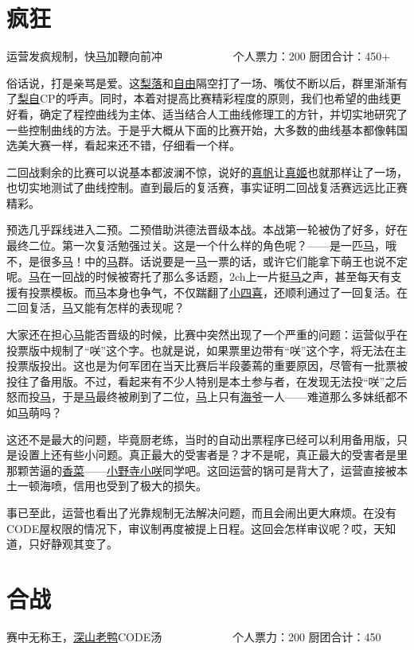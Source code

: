 \chapter{疯狂}
\begin{center}
{\subTitle 运营发疯规制，快\uline{马}加鞭向前冲}
\subMemo
　　　　　　个人票力：200 厨团合计：450+
\end{center}

俗话说，打是亲骂是爱。这\uline{梨落}和\uline{自由}隔空打了一场、嘴仗不断以后，群里渐渐有了\uline{梨}\uline{自}CP的呼声。同时，本着对提高比赛精彩程度的原则，我们也希望的曲线更好看，确定了程控曲线为主体、适当结合人工曲线修理工的方针，并切实地研究了一些控制曲线的方法。于是乎大概从下面的比赛开始，大多数的曲线基本都像韩国选美大赛一样，看起来还不错，仔细看一个样。

二回战剩余的比赛可以说基本都波澜不惊，说好的\uline{真帆}让\uline{真姬}也就那样让了一场，也切实地测试了曲线控制。直到最后的复活赛，事实证明二回战复活赛远远比正赛精彩。

预选几乎踩线进入二预。二预借助洪德法晋级本战。本战第一轮被伪了好多，好在最终二位。第一次复活勉强过关。这是一个什么样的角色呢？——是一匹\uline{马}，哦不，是很多\uline{马}！中的\uline{马}群。话说要是一\uline{马}一票的话，或许它们能拿下萌王也说不定呢。\uline{马}在一回战的时候被寄托了那么多话题，2ch上一片挺\uline{马}之声，甚至每天有支援有投票模板。而\uline{马}本身也争气，不仅踹翻了\uline{小四喜}，还顺利通过了一回复活。在二回复活，\uline{马}又能有怎样的表现呢？

大家还在担心\uline{马}能否晋级的时候，比赛中突然出现了一个严重的问题：运营似乎在投票版中规制了“咲”这个字。也就是说，如果票里边带有“咲”这个字，将无法在主投票版投出。这也是为何军团在当天比赛后半段萎蔫的重要原因，尽管有一批票被投往了备用版。不过，看起来有不少人特别是本土参与者，在发现无法投“咲”之后怒而投\uline{马}，于是\uline{马}最终被刷到了二位，\uline{马}上只有\uline{海爷}一人——难道那么多妹纸都不如\uline{马}萌吗？

这还不是最大的问题，毕竟厨老练，当时的自动出票程序已经可以利用备用版，只是设置上还有些小问题。真正最大的受害者是？才不是呢，真正最大的受害者是里那颗苦逼的\uline{香菜}——\uline{小野寺小咲}同学吧。这回运营的锅可是背大了，运营直接被本土一顿海喷，信用也受到了极大的损失。

事已至此，运营也看出了光靠规制无法解决问题，而且会闹出更大麻烦。在没有CODE屋权限的情况下，审议制再度被提上日程。这回会怎样审议呢？哎，天知道，只好静观其变了。

\chapter{合战}
\begin{center}
{\subTitle 赛中无称王，\uline{深山老鸭}CODE汤}
\subMemo
　　　　　　个人票力：200 厨团合计：450
\end{center}

